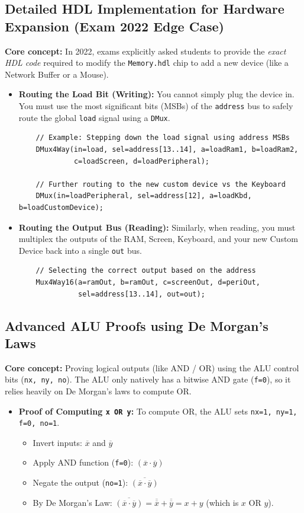 \documentclass[12pt,a4paper]{article}
\begin{document}
\subsection{Detailed HDL Implementation for Hardware Expansion (Exam 2022 Edge Case)}
\textbf{Core concept:} In 2022, exams explicitly asked students to provide the \textit{exact HDL code} required to modify the \texttt{Memory.hdl} chip to add a new device (like a Network Buffer or a Mouse).
\begin{itemize}
    \item \textbf{Routing the Load Bit (Writing):} You cannot simply plug the device in. You must use the most significant bits (MSBs) of the \texttt{address} bus to safely route the global \texttt{load} signal using a \texttt{DMux}.
    \begin{verbatim}
    // Example: Stepping down the load signal using address MSBs
    DMux4Way(in=load, sel=address[13..14], a=loadRam1, b=loadRam2, 
             c=loadScreen, d=loadPeripheral);
             
    // Further routing to the new custom device vs the Keyboard
    DMux(in=loadPeripheral, sel=address[12], a=loadKbd, b=loadCustomDevice);
    \end{verbatim}
    \item \textbf{Routing the Output Bus (Reading):} Similarly, when reading, you must multiplex the outputs of the RAM, Screen, Keyboard, and your new Custom Device back into a single \texttt{out} bus.
    \begin{verbatim}
    // Selecting the correct output based on the address
    Mux4Way16(a=ramOut, b=ramOut, c=screenOut, d=periOut, 
              sel=address[13..14], out=out);
    \end{verbatim}
\end{itemize}

\subsection{Advanced ALU Proofs using De Morgan's Laws}
\textbf{Core concept:} Proving logical outputs (like AND / OR) using the ALU control bits (\texttt{nx, ny, no}). The ALU only natively has a bitwise AND gate (\texttt{f=0}), so it relies heavily on De Morgan's laws to compute OR.
\begin{itemize}
    \item \textbf{Proof of Computing \texttt{x OR y}:} 
    To compute OR, the ALU sets \texttt{nx=1, ny=1, f=0, no=1}.
    \begin{itemize}
        \item Invert inputs: $\overline{x}$ and $\overline{y}$
        \item Apply AND function (\texttt{f=0}): $(\overline{x} \cdot \overline{y})$
        \item Negate the output (\texttt{no=1}): $\overline{(\overline{x} \cdot \overline{y})}$
        \item By De Morgan's Law: $\overline{(\overline{x} \cdot \overline{y})} = \overline{\overline{x}} + \overline{\overline{y}} = x + y$ (which is $x \text{ OR } y$).
    \end{itemize}
\end{itemize}
\end{document}
